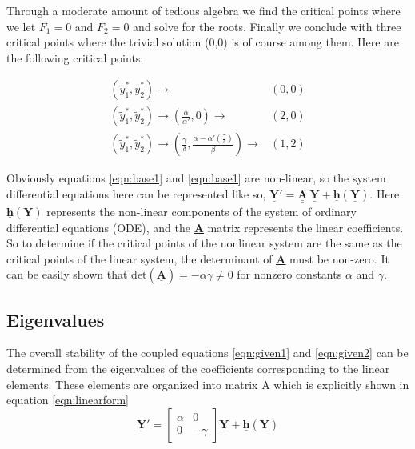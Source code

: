 \documentclass{article}
\def\doubleunderline#1{\underline{\underline{#1}}}
\begin{document}
Through a moderate amount of tedious algebra we find the critical points where we let $F_1=0$ and $F_2=0$ and solve for the roots. Finally we conclude with three critical points where the trivial solution (0,0) is of course among them. Here are the following critical points: 
\\
\begin{mybox}[standard jigsaw, opacityback=0, title=critical points, colframe=black!30!black]
\begin{align}
(\tilde{y}_1^*, \tilde{y}_2^*) \rightarrow &(0,0) \\[6pt]
(\tilde{y}_1^*, \tilde{y}_2^*) \rightarrow (\frac{\alpha}{\alpha'}, 0) \rightarrow &(2,0) \\[6pt]
(\tilde{y}_1^*, \tilde{y}_2^*) \rightarrow (\frac{\gamma}{\delta}, \frac{\alpha - \alpha'\left(\frac{\gamma}{\delta}\right)}{\beta}) \rightarrow &(1,2)
\end{align}
\end{mybox}

Obviously equations \eqref{eqn:base1} and \eqref{eqn:base1} are non-linear, so the system differential equations here can be represented like so, $\underline{\textbf{Y}}'=\doubleunderline{\textbf{A}}\ \underline{\textbf{Y}}+ \underline{\textbf{h}}(\underline{\textbf{Y}})$. Here $\underline{\textbf{h}}(\underline{\textbf{Y}})$ represents the non-linear components of the system of ordinary differential equations (ODE), and the \doubleunderline{\textbf{A}} matrix represents the linear coefficients. So to determine if the critical points of the nonlinear system are the same as the critical points of the linear system, the determinant of \doubleunderline{\textbf{A}} must be non-zero. It can be easily shown that $\text{det}(\doubleunderline{\textbf{A}}) = -\alpha\gamma\neq 0$ for nonzero constants $\alpha$ and $\gamma$.


\subsection{Eigenvalues}
The overall stability of the coupled equations \eqref{eqn:given1} and \eqref{eqn:given2} can be determined from the eigenvalues of the coefficients corresponding to the linear elements. These elements are organized into matrix A which is explicitly shown in equation \eqref{eqn:linearform}
\begin{equation}
\underline{\textbf{Y}}' = 
  \begin{bmatrix}
  \alpha & 0\\
  0 & -\gamma
  \end{bmatrix}
  \underline{\textbf{Y}} + \underline{\textbf{h}}\left(\underline{\textbf{Y}}\right)
  \label{eqn:linearform}
\end{equation}
\end{document}

